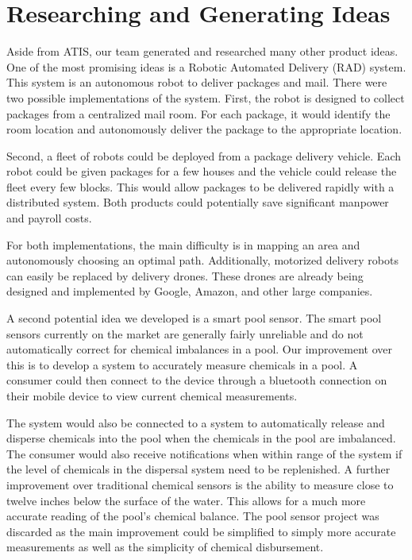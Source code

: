 \documentclass[11pt]{IEEEtran}
\begin{document}
	\section{Researching and Generating Ideas}
		Aside from ATIS, our team generated and researched many other product ideas. One of the most promising ideas is a Robotic Automated Delivery (RAD) system. This system is an autonomous robot to deliver packages and mail. There were two possible implementations of the system. First, the robot is designed to collect packages from a centralized mail room. For each package, it would identify the room location and autonomously deliver the package to the appropriate location.

		Second, a fleet of robots could be deployed from a package delivery vehicle. Each robot could be given packages for a few houses and the vehicle could release the fleet every few blocks. This would allow packages to be delivered rapidly with a distributed system. Both products could potentially save significant manpower and payroll costs.

		For both implementations, the main difficulty is in mapping an area and autonomously choosing an optimal path. Additionally, motorized delivery robots can easily be replaced by delivery drones. These drones are already being designed and implemented by Google, Amazon, and other large companies. 

		A second potential idea we developed is a smart pool sensor. The smart pool sensors currently on the market are generally fairly unreliable and do not automatically correct for chemical imbalances in a pool. Our improvement over this is to develop a system to accurately measure chemicals in a pool. A consumer could then connect to the device through a bluetooth connection on their mobile device to view current chemical measurements. 

		The system would also be connected to a system to automatically release and disperse chemicals into the pool when the chemicals in the pool are imbalanced. The consumer would also receive notifications when within range of the system if the level of chemicals in the dispersal system need to be replenished. A further improvement over traditional chemical sensors is the ability to measure close to twelve inches below the surface of the water. This allows for a much more accurate reading of the pool’s chemical balance. The pool sensor project was discarded as the main improvement could be simplified to simply more accurate measurements as well as the simplicity of chemical disbursement. 
\end{document}
